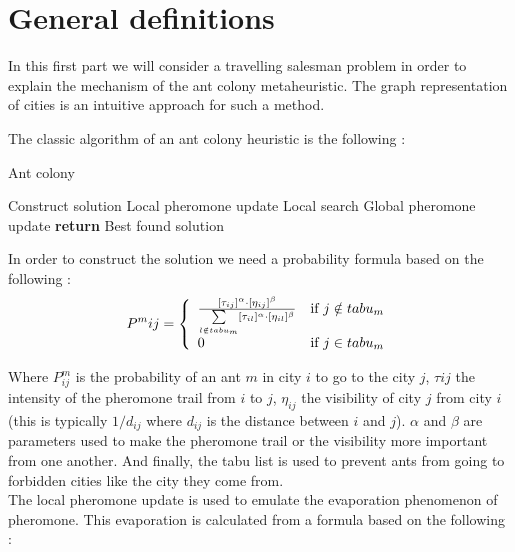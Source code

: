 \documentclass[UTF8, twoside]{EPURapport}
\begin{document}
\section{General definitions}

 	\hspace{4ex}In this first part we will consider a travelling salesman problem in order to explain the mechanism of the ant colony metaheuristic. The graph representation of cities is an intuitive approach for such a method.
	
	
	The classic algorithm of an ant colony heuristic is the following :

\begin{algorithm}
  \caption{Ant colony}
  \begin{algorithmic}[1]
        	\State Construct solution
			\State Local pheromone update
        \EndFor
        \State Local search
        \State Global pheromone update
      \EndFor
      \State \textbf{return} Best found solution
  \end{algorithmic}
\end{algorithm}

	In order to construct the solution we need a probability formula based on the following :
	\\

\[
P^m_{}ij= \left\{ 
\begin{array}{l r}
\frac{[\tau_{ij}]^\alpha \cdot [\eta_{ij}]^\beta}{\underset{l\notin tabu_m}{\sum}[\tau_{il}]^\alpha \cdot [\eta_{il}]^\beta} & \text{if } j\notin tabu_m\\
0 & \text{if } j\in tabu_m
\end{array}
\right.
\]

	Where $P^m_{ij}$ is the probability of an ant $m$ in city $i$ to go to the city $j$, $\tau{ij}$ the intensity of the pheromone trail from $i$ to $j$, $\eta_{ij}$  the visibility of city $j$ from city $i$ (this is typically $1/d_{ij}$ where $d_{ij}$ is the distance between $i$ and $j$). $\alpha$ and $\beta$ are parameters used to make the pheromone trail or the visibility more important from one another. And finally, the tabu list is used to prevent ants from going to forbidden cities like the city they come from.
\\

	The local pheromone update is used to emulate the evaporation phenomenon of pheromone. This evaporation is calculated from a formula based on the following :
	\\
	
\end{document}

